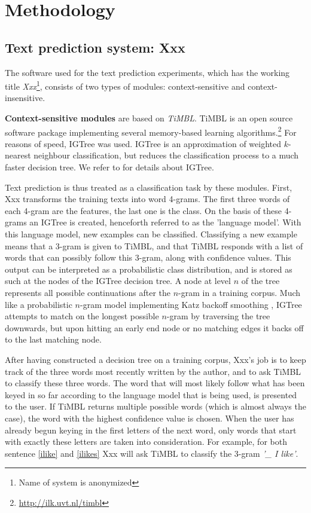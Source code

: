 \documentclass[11pt]{article}
\begin{document}
\section{Methodology}

\subsection{Text prediction system: Xxx}

The software used for the text prediction experiments, which has the working title \emph{Xxx}\footnote{Name of system is anonymized}, consists of two types of modules: context-sensitive and context-insensitive. 

\textbf{Context-sensitive modules} are based on \emph{TiMBL}. TiMBL is an open source software package implementing several memory-based learning algorithms.\footnote{\url{http://ilk.uvt.nl/timbl}} For reasons of speed, IGTree was used. IGTree is an approximation of weighted $k$-nearest neighbour classification, but reduces the classification process to a much faster decision tree. We refer to  for details about IGTree.

Text prediction is thus treated as a classification task by these modules. First, Xxx transforms the training texts into word 4-grams. The first three words of each 4-gram are the features, the last one is the class. On the basis of these 4-grams an IGTree is created, henceforth referred to as the 'language model'. With this language model, new examples can be classified. Classifying a new example means that a 3-gram is given to TiMBL, and that TiMBL responds with a list of words that can possibly follow this 3-gram, along with confidence values. This output can be interpreted as a probabilistic class distribution, and is stored as such at the nodes of the IGTree decision tree. A node at level $n$ of the tree represents all possible continuations after the $n$-gram in a training corpus. Much like a probabilistic $n$-gram model implementing Katz backoff smoothing \cite{katz87}, IGTree attempts to match on the longest possible $n$-gram by traversing the tree downwards, but upon hitting an early end node or no matching edges it backs off to the last matching node.

After having constructed a decision tree on a training corpus, Xxx's job is to keep track of the three words most recently written by the author, and to ask TiMBL to classify these three words. The word that will most likely follow what has been keyed in so far according to the language model that is being used, is presented to the user. If TiMBL returns multiple possible words (which is almost always the case), the word with the highest confidence value is chosen. When the user has already begun keying in the first letters of the next word, only words that start with exactly these letters are taken into consideration. For example, for both sentence \ref{ilike} and \ref{ilikes} Xxx will ask TiMBL to classify the 3-gram \emph{'\_ I like'}.
\end{document}
